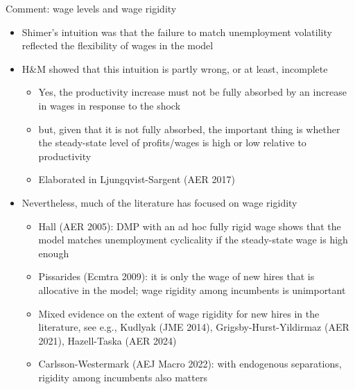 \documentclass[9pt]{beamer}
\newcommand{\bit}{\begin{itemize}}
\newcommand{\eit}{\end{itemize}}
\begin{document}
\begin{frame}{Comment: wage levels and wage rigidity}

\bit
\setlength\itemsep{1.5em}

\item Shimer's intuition was that the failure to match unemployment volatility reflected the flexibility of wages in the model

\item H\&M showed that this intuition is partly wrong, or at least, incomplete
\bit
\setlength\itemsep{0.5em}
	\item Yes, the productivity increase must not be fully absorbed by an increase in wages in response to the shock
	
\item but, given that it is not fully absorbed, the important thing is whether the steady-state level of profits/wages is high or low relative to productivity

\item Elaborated in Ljungqvist-Sargent (AER 2017)
\eit

\item Nevertheless, much of the literature has focused on wage rigidity
\bit
\setlength\itemsep{0.5em}
\item Hall (AER 2005): DMP with an ad hoc fully rigid wage shows that the model matches unemployment cyclicality if the steady-state wage is high enough

\item Pissarides (Ecmtra 2009): it is only the wage of new hires that is allocative in the model; wage rigidity among incumbents is unimportant

\item Mixed evidence on the extent of wage rigidity for new hires in the literature, see e.g., Kudlyak (JME 2014), Grigsby-Hurst-Yildirmaz (AER 2021), Hazell-Taska (AER 2024)

\item Carlsson-Westermark (AEJ Macro 2022): with endogenous separations, rigidity among incumbents also matters
\eit

\eit
\end{frame}
\end{document}
